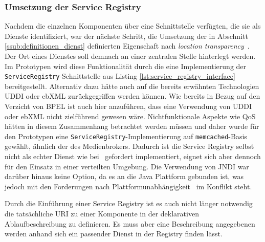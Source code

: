   

  
\subsubsection{Umsetzung der Service Registry} %
\label{ssub:umsetzung_der_service_registry}

  Nachdem die einzelnen Komponenten über eine Schnittstelle verfügten, die sie als Dienste identifiziert, war der nächste Schritt, die Umsetzung der in Abschnitt \ref{ssub:definitionen_dienst} definierten Eigenschaft nach \emph{location transparency}~\citep{service_oriented_computing}. Der Ort eines Dienstes soll demnach an einer zentralen Stelle hinterlegt werden. Im Prototypen wird diese Funktionalität durch die eine Implementierung der \verb!ServiceRegistry!-Schnittstelle aus Listing \ref{lst:service_registry_interface} bereitgestellt. Alternativ dazu hätte auch auf die bereits erwähnten Technologien UDDI oder ebXML zurückgegriffen werden können. Wie bereits in Bezug auf den Verzicht von BPEL ist auch hier anzuführen, dass eine Verwendung von UDDI oder ebXML nicht zielführend gewesen wäre. Nichtfunktionale Aspekte wie QoS hätten in diesem Zusammenhang betrachtet werden müssen und daher wurde für den Prototypen eine \verb!ServiceRegistry!-Implementierung auf \verb!memcached!-Basis gewählt, ähnlich der des Medienbrokers. Dadurch ist die Service Registry selbst nicht als echter Dienst wie bei~\citep{service_oriented_computing} gefordert implementiert, eignet sich aber dennoch für den Einsatz in einer verteilten Umgebung. Die Verwendung von JNDI war darüber hinaus keine Option, da es an die Java Plattform gebunden ist, was jedoch mit den Forderungen nach Plattformunabhängigkeit~\citep{service_oriented_computing} im Konflikt steht.

  

  Durch die Einführung einer Service Registry ist es auch nicht länger notwendig die tatsächliche URI zu einer Komponente in der deklarativen Ablaufbeschreibung zu definieren. Es muss aber eine Beschreibung angegebenen werden anhand sich ein passender Dienst in der Registry finden lässt.
  
